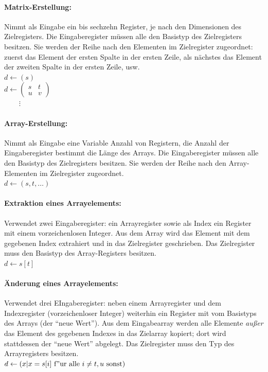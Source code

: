 \documentclass[twoside,a4paper,fleqn,12pt]{article}
\begin{document}
\paragraph{Matrix-Erstellung:} Nimmt als Eingabe ein bis sechzehn Register, je nach den Dimensionen des Zielregisters. Die Eingaberegister müssen alle
den Basistyp des Zielregisters besitzen. Sie werden der Reihe nach den Elementen im Zielregister zugeordnet: zuerst das Element der ersten Spalte in der ersten Zeile,
als nächstes das Element der zweiten Spalte in der ersten Zeile, usw.
\\\hspace*{1cm}$d \gets \left(s\right)$
\\\hspace*{1cm}$d \gets \left(\begin{array}{cc}s&t\\u&v\end{array}\right)$
\\\hspace*{1cm}$\phantom{d \gets}\vdots$

\paragraph{Array-Erstellung:} Nimmt als Eingabe eine Variable Anzahl von Registern, die Anzahl der Eingaberegister bestimmt die Länge des Arrays.
Die Eingaberegister müssen alle den Basistyp des Zielregisters besitzen. Sie werden der Reihe nach den Array-Elementen im Zielregister zugeordnet.
\\\hspace*{1cm}$d \gets (s, t, \dots)$

\paragraph{Extraktion eines Arrayelements:} Verwendet zwei Eingaberegister: ein Arrayregister sowie als Index ein Register mit einem vorzeichenlosen Integer.
Aus dem Array wird das Element mit dem gegebenen Index extrahiert und in das Zielregister geschrieben.
Das Zielregister muss den Basistyp des Array-Registers besitzen.
\\\hspace*{1cm}$d \gets s[t]$

\paragraph{Änderung eines Arrayelements:} Verwendet drei EIngaberegister: neben einem Arrayregister und dem Indexregister (vorzeichenloser Integer)
weiterhin ein Register mit vom Basistyps des Arrays (der "`neue Wert"').
Aus dem Eingabearray werden alle Elemente \emph{außer} das Element des gegebenen Indexes in das Zielarray kopiert;
dort wird stattdessen der "`neue Wert"' abgelegt. Das Zielregister muss den Typ des Arrayregisters besitzen.
\\\hspace*{1cm}$d \gets (x | x = s[i]\ \mathrm{f"ur\ alle}\ i \neq t, u\ \mathrm{sonst})$
\end{document}
